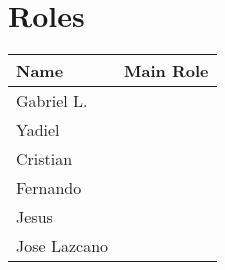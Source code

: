 \documentclass{article}
\begin{document}
\section{Roles}
\begin{center}

\begin{tabular}{| l | p{5cm} |}\hline
Name & Main Role \\ \hline
Gabriel L. & \\ \hline
Yadiel     & \\ \hline
Cristian   & \\ \hline
Fernando   & \\ \hline
Jesus	   & \\ \hline
Jose Lazcano  & \\ \hline
\end{tabular}

\end{center}
\end{document}
